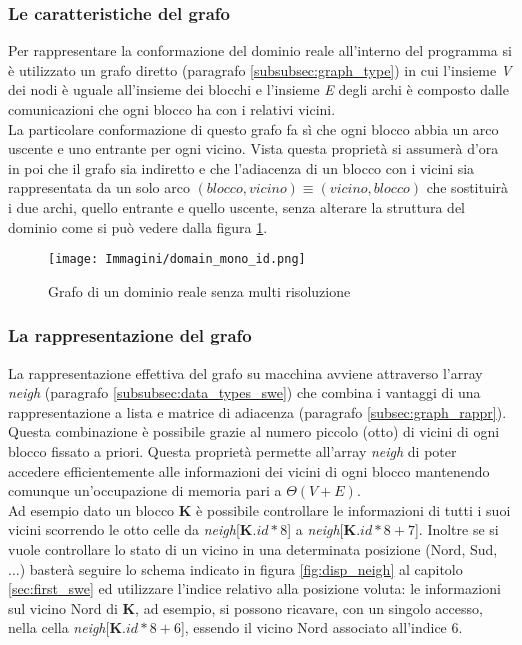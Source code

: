 \subsubsection{Le caratteristiche del grafo}
Per rappresentare la conformazione del dominio reale all'interno del programma si è utilizzato un grafo diretto (paragrafo \ref{subsubsec:graph_type}) in cui l'insieme \textit{V} dei nodi è uguale all'insieme dei blocchi e l'insieme \textit{E} degli archi è composto dalle comunicazioni che ogni blocco ha con i relativi vicini.\\
La particolare conformazione di questo grafo fa sì che ogni blocco abbia un arco uscente e uno entrante per ogni vicino. Vista questa proprietà si assumerà d'ora in poi che il grafo sia indiretto e che l'adiacenza di un blocco con i vicini sia rappresentata da un solo arco $(blocco,vicino) \equiv (vicino,blocco)$ che sostituirà i due archi, quello entrante e quello uscente, senza alterare la struttura del dominio come si può vedere dalla figura \ref{fig:domain_graph}.\\
\begin{figure}[H]
	\centering
	\texttt{[image: Immagini/domain\_mono\_id.png]}
	\caption{Grafo di un dominio reale senza multi risoluzione}
	\label{fig:domain_graph}
\end{figure}

\subsubsection{La rappresentazione del grafo}
La rappresentazione effettiva del grafo su macchina avviene attraverso l'array \textit{neigh} (paragrafo \ref{subsubsec:data_types_swe}) che combina i vantaggi di una rappresentazione a lista e matrice di adiacenza (paragrafo \ref{subsec:graph_rappr}). Questa combinazione è possibile grazie al numero piccolo (otto) di vicini di ogni blocco fissato a priori. Questa proprietà permette all'array \textit{neigh} di poter accedere efficientemente alle informazioni dei vicini di ogni blocco mantenendo comunque un'occupazione di memoria pari a $\Theta(V+E)$.\\
Ad esempio dato un blocco \textbf{K} è possibile controllare le informazioni di tutti i suoi vicini scorrendo le otto celle da \textit{neigh}[\textbf{K}$.id*8$] a \textit{neigh}[\textbf{K}$.id*8 + 7$]. Inoltre se si vuole controllare lo stato di un vicino in una determinata posizione (Nord, Sud, $\ldots$) basterà seguire lo schema indicato in figura \ref{fig:disp_neigh} al capitolo \ref{sec:first_swe} ed utilizzare l'indice relativo alla posizione voluta: le informazioni sul vicino Nord di \textbf{K}, ad esempio, si possono ricavare, con un singolo accesso, nella cella \textit{neigh}[\textbf{K}.$id*8 + 6$], essendo il vicino Nord associato all'indice 6.

